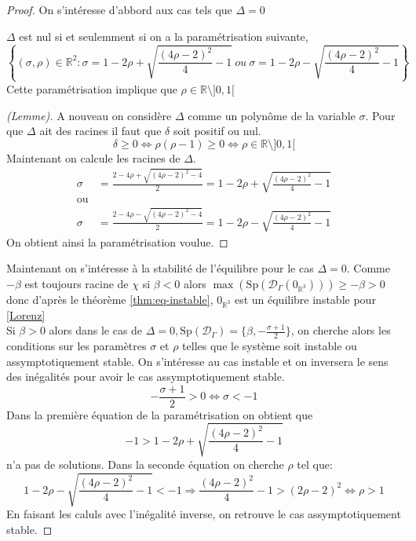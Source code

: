\documentclass{article}
\newcommand{\R}{\mathbb{R}}
\newtheorem[M , nocut]{prop}{Proposition}[section]
\newtheorem[M , nocut]{definition}{Définition}
\newtheorem[M , nocut]{lemme}{Lemme}
\newtheorem[L , nocut]{thm}{Théoreme}
\newtheorem[M , nocut]{cor}{Corollaire}
\begin{document}
\begin{proof} %
    On s'intéresse d'abbord aux cas tels que $\Delta=0$

    \begin{lemme} 
        \label{lemme:Deg0}
        $\Delta$ est nul si et seulemment si on a la paramétrisation suivante,
        \[
            \left\{(\sigma,\rho)\in \R ^2 :\sigma = 1-2 \rho + \sqrt{ \frac{(4\rho-2)^2}{4} -1 }\ ou\ \sigma = 1-2 \rho - \sqrt{ \frac{(4\rho-2)^2}{4} -1 } \right\}  
        \]
        Cette paramétrisation implique que $\rho \in \R \setminus ]0,1[$
    \end{lemme}
    
    \begin{proof}[(Lemme)]
        A nouveau on considère $\Delta$ comme un polynôme de la variable $\sigma$. Pour que $\Delta$ ait des racines il faut que $\delta$ soit positif ou nul.
        \[
        \delta \ge 0 \Leftrightarrow \rho(\rho-1) \ge 0 \Leftrightarrow \rho \in \R \setminus ]0,1[
        \] Maintenant on calcule les racines de $\Delta$.
        \begin{align*}
            \sigma &= \frac{2-4\rho + \sqrt{ (4\rho-2)^2 -4 }}{2} = 1-2 \rho + \sqrt{ \frac{(4\rho-2)^2}{4} -1 }\\
            \text{ou}\\
            \sigma &= \frac{2-4\rho - \sqrt{ (4\rho-2)^2 -4 }}{2} = 1-2 \rho - \sqrt{ \frac{(4\rho-2)^2}{4} -1 }
        \end{align*}
        On obtient ainsi la paramétrisation voulue.
    \end{proof}
    Maintenant on s'intéresse à la stabilité de l'équilibre pour le cas $\Delta=0$. Comme $-\beta$ est toujours racine de $\chi$ si $\beta <0$ alors $\max (\mathrm{Sp}(\mathcal{D}_\Gamma (0_{\R^3}))) \ge -\beta > 0$ donc d'après le théorème \ref{thm:eq-instable}, $0_{\R^3}$ est un équilibre instable pour \eqref{Lorenz}\\
    Si $\beta > 0$ alors dans le cas de $\Delta = 0, \mathrm{Sp}(\mathcal{D}_\Gamma) = \{\beta, -\frac{\sigma+1}{2}\}$, on cherche alors les conditions sur les paramètres $\sigma$ et $\rho$ telles que le système soit instable ou assymptotiquement stable.
    On s'intéresse au cas instable et on inversera le sens des inégalités pour avoir le cas assymptotiquement stable. 
    \[
        -\frac{\sigma+1}{2} >0 \Leftrightarrow \sigma < -1   
    \]
    Dans la première équation de la paramétrisation on obtient que 
    \[-1 > 1-2 \rho + \sqrt{ \frac{(4\rho-2)^2}{4} -1}\] n'a pas de solutions.
    Dans la seconde équation on cherche $\rho$ tel que:
    \[
        1-2 \rho - \sqrt{ \frac{(4\rho-2)^2}{4} -1 } < -1 \Rightarrow \frac{(4\rho-2)^2}{4} -1 > (2\rho-2)^2 \Leftrightarrow \rho > 1 
    \]En faisant les caluls avec l'inégalité inverse, on retrouve le cas assymptotiquement stable.
\end{proof}
\end{document}
